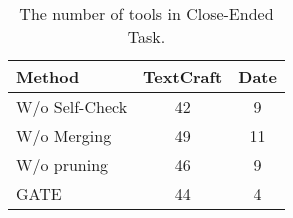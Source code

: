 \begingroup
\begin{table}[H]
\caption{The number of tools in Close-Ended Task.}
\label{tab:closed-toolnumber}
\vskip -0.1in
\setlength{\tabcolsep}{10pt} %
\begin{center}
\begin{small}
\begin{sc}
\begin{tabular}{l|cc}
\toprule
\textnormal{\textbf{Method}} & \textnormal{\textbf{TextCraft}}  & \textnormal{\textbf{Date}} \\
\midrule         

\normalfont W/o Self-Check & 42 & 9 \\
\midrule  
\normalfont W/o Merging & 49 & 11\\
\midrule  
\normalfont W/o pruning & 46 & 9 \\
\midrule  
\normalfont GATE & 44 & 4 \\


\bottomrule
\end{tabular}
\end{sc}
\end{small}
\end{center}
\vskip -0.1in
\end{table}
\endgroup
